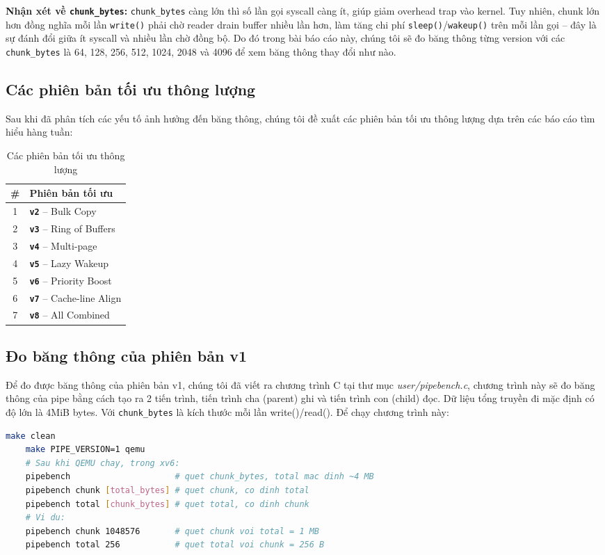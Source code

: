 \documentclass[12pt,a4paper]{article}
\newcommand{\vv}[1]{\textbf{\texttt{#1}}}
\newcommand{\code}[1]{\texttt{#1}}
\begin{document}
\textbf{Nhận xét về \texttt{chunk\_bytes}:}
\texttt{chunk\_bytes} càng lớn thì số lần gọi syscall càng ít, giúp giảm
overhead trap vào kernel. Tuy nhiên, chunk lớn hơn đồng nghĩa mỗi lần
\code{write()} phải chờ reader drain buffer nhiều lần hơn, làm tăng chi phí
\code{sleep()}/\code{wakeup()} trên mỗi lần gọi -- đây là sự đánh đổi giữa
ít syscall và nhiều lần chờ đồng bộ. Do đó trong bài báo cáo này, chúng tôi sẽ đo băng thông từng version với các \code{chunk\_bytes} là 64, 128, 256, 512, 1024, 2048 và 4096 để xem băng thông thay đổi như nào.

\subsection{Các phiên bản tối ưu thông lượng}
Sau khi đã phân tích các yếu tố ảnh hưởng đến băng thông, chúng tôi đề xuất các phiên bản tối ưu thông lượng dựa trên các báo cáo tìm hiểu hàng tuần:
\begin{table}[H]
\centering
\caption{Các phiên bản tối ưu thông lượng}
\begin{tabular}{cl}
\toprule
\textbf{\#} & \textbf{Phiên bản tối ưu} \\
\midrule
1 & \vv{v2} -- Bulk Copy \\
2 & \vv{v3} -- Ring of Buffers \\
3 & \vv{v4} -- Multi-page \\
4 & \vv{v5} -- Lazy Wakeup \\
5 & \vv{v6} -- Priority Boost \\
6 & \vv{v7} -- Cache-line Align \\
7 & \vv{v8} -- All Combined \\
\bottomrule
\end{tabular}
\end{table}

\subsection{Đo băng thông của phiên bản v1}
Để đo được băng thông của phiên bản v1, chúng tôi đã viết ra chương trình C tại thư mục \textit{user/pipebench.c}, chương trình này sẽ đo băng thông của pipe bằng cách tạo ra 2 tiến trình, tiến trình cha (parent) ghi và tiến trình con (child) đọc. 
Dữ liệu tổng truyền đi mặc định có độ lớn là 4MiB bytes. Với \code{chunk\_bytes} là kích thước mỗi lần write()/read(). Để chạy chương trình này:
\begin{lstlisting}[language=bash]
    make clean
    make PIPE_VERSION=1 qemu
    # Sau khi QEMU chay, trong xv6:
    pipebench                     # quet chunk_bytes, total mac dinh ~4 MB
    pipebench chunk [total_bytes] # quet chunk, co dinh total
    pipebench total [chunk_bytes] # quet total, co dinh chunk
    # Vi du:
    pipebench chunk 1048576       # quet chunk voi total = 1 MB
    pipebench total 256           # quet total voi chunk = 256 B
\end{lstlisting}
\end{document}
